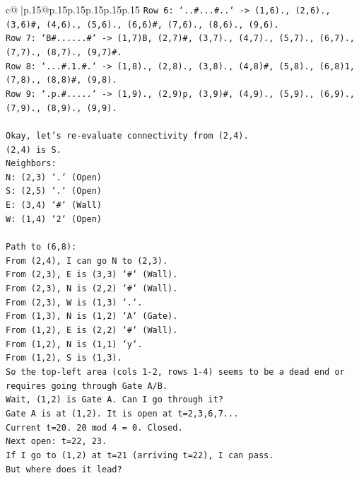 \documentclass{article}
\begin{document}
{\begin{supertabular}{c@{$\;$}|p{.15\linewidth}@{}p{.15\linewidth}p{.15\linewidth}p{.15\linewidth}p{.15\linewidth}p{.15\linewidth}}
{{{\texttt{Row 6: `..\#...\#..` {-}> (1,6)., (2,6)., (3,6)\#, (4,6)., (5,6)., (6,6)\#, (7,6)., (8,6)., (9,6).} \\
\texttt{Row 7: `B\#......\#` {-}> (1,7)B, (2,7)\#, (3,7)., (4,7)., (5,7)., (6,7)., (7,7)., (8,7)., (9,7)\#.} \\
\texttt{Row 8: `...\#.1.\#.` {-}> (1,8)., (2,8)., (3,8)., (4,8)\#, (5,8)., (6,8)1, (7,8)., (8,8)\#, (9,8).} \\
\texttt{Row 9: `.p.\#.....` {-}> (1,9)., (2,9)p, (3,9)\#, (4,9)., (5,9)., (6,9)., (7,9)., (8,9)., (9,9).} \\
\\ 
\texttt{Okay, let's re{-}evaluate connectivity from (2,4).} \\
\texttt{(2,4) is S.} \\
\texttt{Neighbors:} \\
\texttt{N: (2,3) `.` (Open)} \\
\texttt{S: (2,5) `.` (Open)} \\
\texttt{E: (3,4) `\#` (Wall)} \\
\texttt{W: (1,4) `2` (Open)} \\
\\ 
\texttt{Path to (6,8):} \\
\texttt{From (2,4), I can go N to (2,3).} \\
\texttt{From (2,3), E is (3,3) `\#` (Wall).} \\
\texttt{From (2,3), N is (2,2) `\#` (Wall).} \\
\texttt{From (2,3), W is (1,3) `.`.} \\
\texttt{From (1,3), N is (1,2) `A` (Gate).} \\
\texttt{From (1,2), E is (2,2) `\#` (Wall).} \\
\texttt{From (1,2), N is (1,1) `y`.} \\
\texttt{From (1,2), S is (1,3).} \\
\texttt{So the top{-}left area (cols 1{-}2, rows 1{-}4) seems to be a dead end or requires going through Gate A/B.} \\
\texttt{Wait, (1,2) is Gate A. Can I go through it?} \\
\texttt{Gate A is at (1,2). It is open at t=2,3,6,7...} \\
\texttt{Current t=20. 20 mod 4 = 0. Closed.} \\
\texttt{Next open: t=22, 23.} \\
\texttt{If I go to (1,2) at t=21 (arriving t=22), I can pass.} \\
\texttt{But where does it lead?} \\
}}}
\end{supertabular}}
\end{document}
